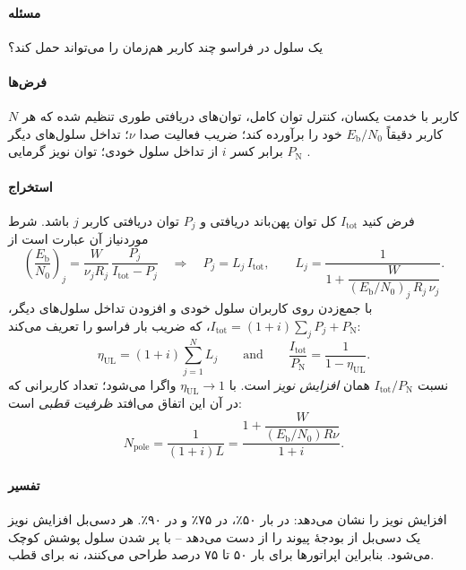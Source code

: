\documentclass[11pt,a4paper]{article}
\begin{document}
\paragraph{مسئله} یک سلول  در فراسو چند کاربر هم‌زمان را می‌تواند حمل کند؟
\paragraph{فرض‌ها} $N$ کاربر با خدمت یکسان، کنترل توان کامل، توان‌های دریافتی طوری تنظیم شده که هر
کاربر دقیقاً $E_\mathrm{b}/N_0$ خود را برآورده کند؛ ضریب فعالیت صدا $\nu$؛ تداخل سلول‌های دیگر
برابر کسر $i$ از تداخل سلول خودی؛ توان نویز گرمایی $P_\mathrm{N}$ \cite{holma2010wcdma}.
\paragraph{استخراج} فرض کنید $I_{\mathrm{tot}}$ کل توان پهن‌باند دریافتی و $P_j$ توان دریافتی کاربر
$j$ باشد. شرط موردنیاز آن عبارت است از
\begin{equation}\label{eq:userreq}
  \left(\frac{E_\mathrm{b}}{N_0}\right)_j = \frac{W}{\nu_j R_j}\,\frac{P_j}{I_{\mathrm{tot}}-P_j}
  \quad\Longrightarrow\quad
  P_j = L_j\,I_{\mathrm{tot}}, \qquad
  L_j = \frac{1}{1+\dfrac{W}{(E_\mathrm{b}/N_0)_j\,R_j\,\nu_j}} .
\end{equation}
با جمع‌زدن روی کاربران سلول خودی و افزودن تداخل سلول‌های دیگر،
$I_{\mathrm{tot}} = (1+i)\sum_j P_j + P_\mathrm{N}$، که ضریب بار فراسو را تعریف می‌کند:
\begin{equation}\label{eq:load}
  \eta_{\mathrm{UL}} = (1+i)\sum_{j=1}^{N} L_j
  \qquad\text{and}\qquad
  \frac{I_{\mathrm{tot}}}{P_\mathrm{N}} = \frac{1}{1-\eta_{\mathrm{UL}}} .
\end{equation}
نسبت $I_{\mathrm{tot}}/P_\mathrm{N}$ همان \emph{افزایش نویز} است. با $\eta_{\mathrm{UL}}\to1$ واگرا
می‌شود؛ تعداد کاربرانی که در آن این اتفاق می‌افتد \emph{ظرفیت قطبی} است:
\begin{equation}\label{eq:pole}
  N_{\mathrm{pole}} = \frac{1}{(1+i)L} = \frac{1+\dfrac{W}{(E_\mathrm{b}/N_0)R\nu}}{1+i}.
\end{equation}
\paragraph{تفسیر}  افزایش نویز را نشان می‌دهد:  در بار ۵۰٪، 
در ۷۵٪ و  در ۹۰٪. هر دسی‌بل افزایش نویز یک دسی‌بل از بودجهٔ پیوند را از دست می‌دهد --
با پر شدن سلول پوشش کوچک می‌شود. بنابراین اپراتورها برای بار ۵۰ تا ۷۵ درصد طراحی می‌کنند، نه
برای قطب.
\end{document}
